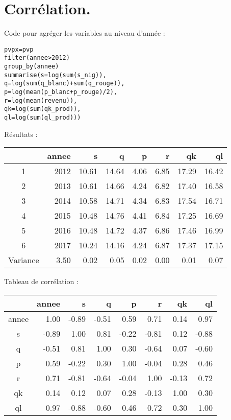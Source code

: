 \documentclass[11pt, a4paper]{article}
\begin{document}
\section*{Corrélation.}
\par
Code pour agréger les variables au niveau d'année :
\begin{alltt}
  pvpx = pvp %>% 
  filter(annee > 2012) %>% 
  group_by(annee) %>%
  summarise(s = log(sum(s_nig)), 
      q = log(sum(q_blanc) + sum(q_rouge)), 
      p = log(mean(p_blanc + p_rouge)/2),
      r = log(mean(revenu)),
      qk = log(sum(qk_prod)),
      ql = log(sum(ql_prod)))
\end{alltt}
Résultats :
\FloatBarrier
\begin{center}
\begin{tabular}{c|rrrrrrr}
  \hline
 & annee & s & q & p & r & qk & ql \\ 
  \hline
  1 & 2012 & 10.61 & 14.64 & 4.06 & 6.85 & 17.29 & 16.42 \\ 
  2 & 2013 & 10.61 & 14.66 & 4.24 & 6.82 & 17.40 & 16.58 \\ 
  3 & 2014 & 10.58 & 14.71 & 4.34 & 6.83 & 17.54 & 16.71 \\ 
  4 & 2015 & 10.48 & 14.76 & 4.41 & 6.84 & 17.25 & 16.69 \\ 
  5 & 2016 & 10.48 & 14.72 & 4.37 & 6.86 & 17.46 & 16.99 \\ 
  6 & 2017 & 10.24 & 14.16 & 4.24 & 6.87 & 17.37 & 17.15 \\ 
   \hline
  Variance & 3.50 & 0.02 & 0.05 & 0.02 & 0.00 & 0.01 & 0.07 \\ 
   \hline
\end{tabular}
\end{center}
\FloatBarrier
Tableau de corrélation :
\FloatBarrier
\begin{center}
\begin{tabular}{|c|rrrrrrr}
  \hline
  & annee & s & q & p & r & qk & ql \\ 
  \hline
  annee & 1.00 & -0.89 & -0.51 & 0.59 & 0.71 & 0.14 & 0.97 \\ 
  s & -0.89 & 1.00 & 0.81 & -0.22 & -0.81 & 0.12 & -0.88 \\ 
  q & -0.51 & 0.81 & 1.00 & 0.30 & -0.64 & 0.07 & -0.60 \\ 
  p & 0.59 & -0.22 & 0.30 & 1.00 & -0.04 & 0.28 & 0.46 \\ 
  r & 0.71 & -0.81 & -0.64 & -0.04 & 1.00 & -0.13 & 0.72 \\ 
  qk & 0.14 & 0.12 & 0.07 & 0.28 & -0.13 & 1.00 & 0.30 \\ 
  ql & 0.97 & -0.88 & -0.60 & 0.46 & 0.72 & 0.30 & 1.00 \\ 
   \hline
\end{tabular}
\end{center}
\FloatBarrier
\newpage
\end{document}
